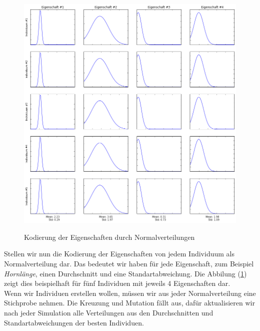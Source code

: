             \begin{figure}[H]
                    \begin{center}
                        \includegraphics[scale=0.49]{../pictures/diagrams/cross-entropy-visualization-ga.png}\\
                        \caption{Kodierung der Eigenschaften durch Normalverteilungen}\label{fig:norm-dist-encoding}
                    \end{center}
            \end{figure}

            Stellen wir nun die Kodierung der Eigenschaften von jedem Individuum als Normalverteilung dar. Das bedeutet wir haben für jede Eigenschaft, zum Beispiel \textit{Hornlänge}, einen Durchschnitt und eine Standartabweichung. Die Abbilung (\ref{fig:norm-dist-encoding}) zeigt dies beispielhaft für fünf Individuen mit jeweils 4 Eigenschaften dar.\\[3mm]
            \noindent
            Wenn wir Individuen erstellen wollen, müssen wir aus jeder Normalverteilung eine Stichprobe nehmen. Die Kreuzung und Mutation fällt aus, dafür aktualisieren wir nach jeder Simulation alle Verteilungen aus den Durchschnitten und Standartabweichungen der besten Individuen.
